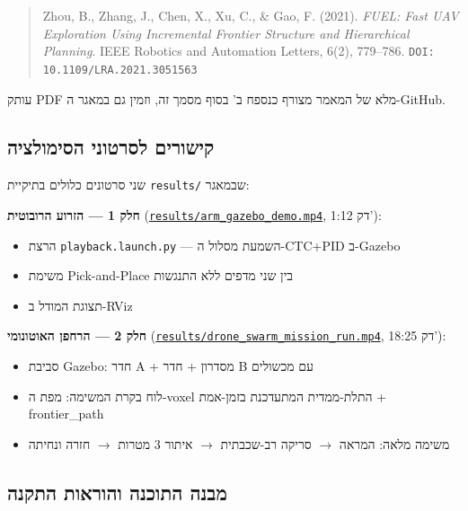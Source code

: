 \documentclass[11pt,a4paper]{article}
\newcommand{\repourl}{https://github.com/ThEpiCake/Robot_Navigation_and_Control}
\begin{document}
\begin{quote}
\textenglish{Zhou, B., Zhang, J., Chen, X., Xu, C., \& Gao, F. (2021). \textit{FUEL: Fast UAV Exploration Using Incremental Frontier Structure and Hierarchical Planning}. IEEE Robotics and Automation Letters, 6(2), 779–786. \texttt{DOI: 10.1109/LRA.2021.3051563}}
\end{quote}

עותק \textenglish{PDF} מלא של המאמר מצורף כנספח ב' בסוף מסמך זה, וזמין גם במאגר ה-\textenglish{GitHub}.

\subsection{קישורים לסרטוני הסימולציה}

שני סרטונים כלולים בתיקיית \texttt{\textenglish{results/}} שבמאגר:

\textbf{חלק 1 — הזרוע הרובוטית} (\href{\repourl/blob/main/results/arm_gazebo_demo.mp4}{\textenglish{\texttt{results/arm\_gazebo\_demo.mp4}}}, 1:12 דק'):
\begin{itemize}
    \item הרצת \texttt{\textenglish{playback.launch.py}} — השמעת מסלול ה-\textenglish{CTC+PID} ב-\textenglish{Gazebo}
    \item משימת \textenglish{Pick-and-Place} בין שני מדפים ללא התנגשות
    \item תצוגת המודל ב-\textenglish{RViz}
\end{itemize}

\textbf{חלק 2 — הרחפן האוטונומי} (\href{\repourl/blob/main/results/drone_swarm_mission_run.mp4}{\textenglish{\texttt{results/drone\_swarm\_mission\_run.mp4}}}, 18:25 דק'):
\begin{itemize}
    \item סביבת \textenglish{Gazebo}: חדר A + מסדרון + חדר B עם מכשולים
    \item לוח בקרת המשימה: מפת ה-\textenglish{voxel} התלת-ממדית המתעדכנת בזמן-אמת + \textenglish{frontier\_path}
    \item משימה מלאה: המראה $\rightarrow$ סריקה רב-שכבתית $\rightarrow$ איתור 3 מטרות $\rightarrow$ חזרה ונחיתה
\end{itemize}

\subsection{מבנה התוכנה והוראות התקנה}
\end{document}
